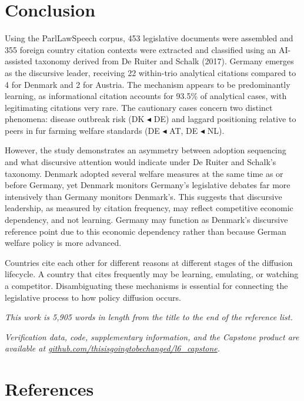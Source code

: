 \documentclass[twocolumn, 10pt, a4paper]{article}
\newcommand{\githublink}{\href{https://github.com/thisisgoingtobechanged/l6_capstone}{github.com/thisisgoingtobechanged/l6\_capstone}}
\begin{document}
\section{Conclusion}

Using the ParlLawSpeech corpus, 453 legislative documents were assembled and 355
foreign country citation contexts were extracted and classified using an AI-assisted
taxonomy derived from De Ruiter and Schalk (2017). Germany emerges as the discursive
leader, receiving 22 within-trio analytical citations compared to 4 for Denmark and
2 for Austria. The mechanism appears to be predominantly learning, as informational
citation accounts for 93.5\% of analytical cases, with legitimating citations very
rare. The cautionary cases concern two distinct phenomena: disease outbreak risk
(DK $\blacktriangleleft$ DE) and laggard positioning relative to peers in fur farming welfare
standards (DE $\blacktriangleleft$ AT, DE $\blacktriangleleft$ NL).

However, the study demonstrates an asymmetry between adoption sequencing and what
discursive attention would indicate under De Ruiter and Schalk's taxonomy. Denmark
adopted several welfare measures at the same time as or before Germany, yet Denmark
monitors Germany's legislative debates far more intensively than Germany monitors
Denmark's. This suggests that discursive leadership, as measured by citation
frequency, may reflect competitive economic dependency, and not learning. Germany may
function as Denmark's discursive reference point due to this economic dependency
rather than because German welfare policy is more advanced.

Countries cite each other for different reasons at different stages of the diffusion
lifecycle. A country that cites frequently may be learning, emulating, or watching a
competitor. Disambiguating these mechanisms is essential for connecting the
legislative process to how policy diffusion occurs.

\vspace{0.5em}
\noindent\small\textit{This work is 5{,}905 words in length from the title to the end of the reference list.}

\vspace{0.3em}
\noindent\small\textit{Verification data, code, supplementary information, and the Capstone product are available at \githublink.}

\section*{References}
\begingroup
\setlength{\parskip}{3pt}
\footnotesize
\end{document}
